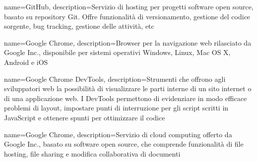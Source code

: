 {
	name=GitHub,
	description={Servizio di hosting per progetti software open source, basato su repository Git. Offre funzionalità di versionamento, gestione del codice sorgente, bug tracking, gestione delle attività, etc}
}

{
	name=Google Chrome,
	description={Browser per la navigazione web rilasciato da Google Inc., disponibile per sistemi operativi Windows, Linux, Mac OS X, Android e iOS}
}

{
	name=Google Chrome DevTools,
	description={Strumenti che offrono agli sviluppatori web la possibilità di visualizzare le parti interne di un sito internet o di una applicazione web. I DevTools permettono di evidenziare in modo efficace problemi di layout, impostare punti di interruzione per gli script scritti in JavaScript e ottenere spunti per ottimizzare il codice}
}

{
	name=Google Chrome,
	description={Servizio di cloud computing offerto da Google Inc., basato su software open source, che comprende funzionalità di file hosting, file sharing e modifica collaborativa di documenti}
}
